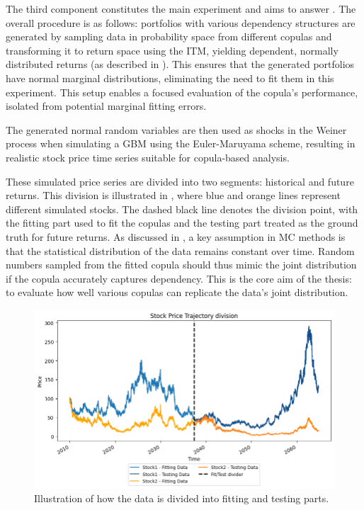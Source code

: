 The third component constitutes the main experiment and aims to answer \RQthree. The overall procedure is as follows: portfolios with various dependency structures are generated by sampling data in probability space from different copulas and transforming it to return space using the \gls{ITM}, yielding dependent, normally distributed returns (as described in ). This ensures that the generated portfolios have normal marginal distributions, eliminating the need to fit them in this experiment. This setup enables a focused evaluation of the copula's performance, isolated from potential marginal fitting errors.

The generated normal random variables are then used as shocks in the Weiner process when simulating a \gls{GBM} using the Euler-Maruyama scheme, resulting in realistic stock price time series suitable for copula-based analysis.

These simulated price series are divided into two segments: historical and future returns. This division is illustrated in , where blue and orange lines represent different simulated stocks. The dashed black line denotes the division point, with the fitting part used to fit the copulas and the testing part treated as the ground truth for future returns. As discussed in , a key assumption in \gls{MC} methods is that the statistical distribution of the data remains constant over time. Random numbers sampled from the fitted copula should thus mimic the joint distribution if the copula accurately captures dependency. This is the core aim of the thesis: to evaluate how well various copulas can replicate the data’s joint distribution.

\begin{figure}
\centering
\includegraphics[width=1\textwidth]{4Method/pictures/DataDivision.png}
\caption{Illustration of how the data is divided into fitting and testing parts.}
\label{fig:DataDivision}
\end{figure}

